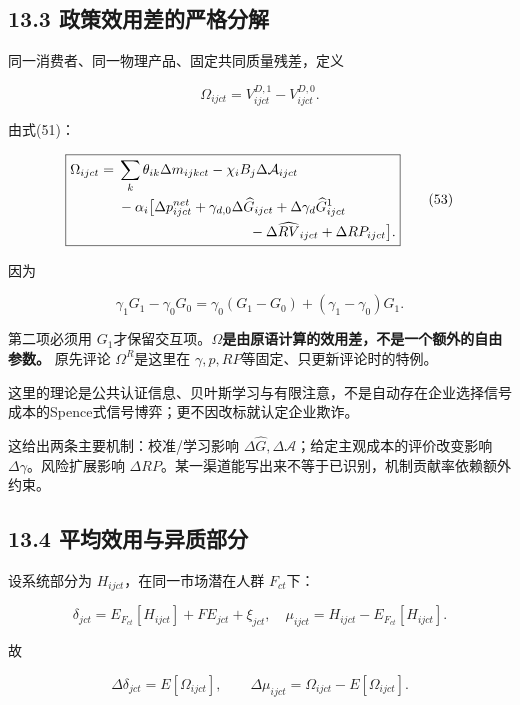 \documentclass[
  11pt,
]{article}
\begin{document}
\subsection{13.3
政策效用差的严格分解}\label{ux653fux7b56ux6548ux7528ux5deeux7684ux4e25ux683cux5206ux89e3}

同一消费者、同一物理产品、固定共同质量残差，定义

\[
\Omega_{ijct}=V_{ijct}^{D,1}-V_{ijct}^{D,0}. \tag{52}
\]

由式(51)：

\[
\boxed{\begin{aligned}
\Omega_{ijct}={}&\sum_k\theta_{ik}\Delta m_{ijkct}
-\chi_iB_j\Delta\mathcal A_{ijct}\\
&-\alpha_i\big[
\Delta p_{ijct}^{net}
+\gamma_{d,0}\Delta\widehat G_{ijct}
+\Delta\gamma_d\widehat G_{ijct}^{1}\\
&\hspace{33mm}-\Delta\widehat{RV}_{ijct}
+\Delta RP_{ijct}\big].
\end{aligned}} \tag{53}
\]

因为

\[
\gamma_1G_1-\gamma_0G_0
=\gamma_0(G_1-G_0)+(\gamma_1-\gamma_0)G_1.
\tag{54}
\]

第二项必须用
\(G_1\)才保留交互项。\textbf{\(\Omega\)是由原语计算的效用差，不是一个额外的自由参数。}
原先评论 \(\Omega^R\)是这里在
\(\gamma,p,RP\)等固定、只更新评论时的特例。

这里的理论是公共认证信息、贝叶斯学习与有限注意，不是自动存在企业选择信号成本的Spence式信号博弈；更不因改标就认定企业欺诈。

这给出两条主要机制：校准/学习影响
\(\Delta\widehat G,\Delta\mathcal A\)；给定主观成本的评价改变影响
\(\Delta\gamma\)。风险扩展影响
\(\Delta RP\)。某一渠道能写出来不等于已识别，机制贡献率依赖额外约束。

\subsection{13.4
平均效用与异质部分}\label{ux5e73ux5747ux6548ux7528ux4e0eux5f02ux8d28ux90e8ux5206}

设系统部分为 \(H_{ijct}\)，在同一市场潜在人群 \(F_{ct}\)下：

\[
\delta_{jct}=E_{F_{ct}}[H_{ijct}]+FE_{jct}+\xi_{jct},\quad
\mu_{ijct}=H_{ijct}-E_{F_{ct}}[H_{ijct}]. \tag{55}
\]

故

\[
\Delta\delta_{jct}=E[\Omega_{ijct}],\qquad
\Delta\mu_{ijct}=\Omega_{ijct}-E[\Omega_{ijct}]. \tag{56}
\]
\end{document}
